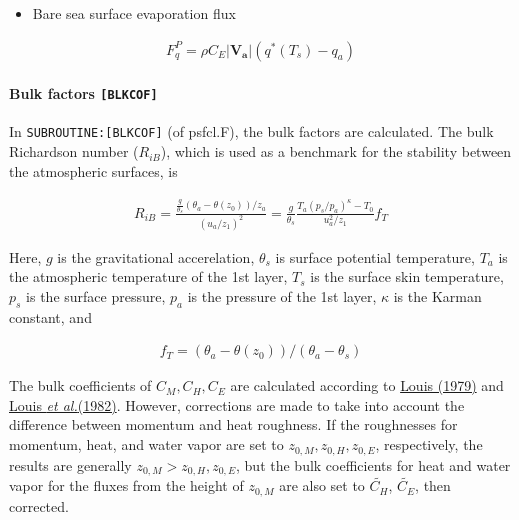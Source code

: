 \begin{itemize}
\tightlist
\item
  Bare sea surface evaporation flux
\end{itemize}

\begin{eqnarray}
    F_q^P = \rho C_E |\mathbf{V_a}| \left( q^{\ast}(T_s) - q_a \right)
\end{eqnarray}

\hypertarget{bulk-factors-blkcof}{%
\paragraph{\texorpdfstring{Bulk factors
\texttt{{[}BLKCOF{]}}}{Bulk factors {[}BLKCOF{]}}}\label{bulk-factors-blkcof}}

In \texttt{SUBROUTINE:{[}BLKCOF{]}} (of psfcl.F), the bulk factors are
calculated. The bulk Richardson number (\(R_{iB}\)), which is used as a
benchmark for the stability between the atmospheric surfaces, is

\begin{eqnarray}
R_{iB} =
            \frac{ \frac{g}{\theta_s} (\theta_a - \theta(z_0))/z_a }
              { (u_a/z_1)^2                                  }
       = \frac{g}{\theta_s}
         \frac{T_a (p_s/p_a)^\kappa - T_0 }{u_a^2/z_1} f_T
\end{eqnarray}

Here, \(g\) is the gravitational accerelation, \(\theta_s\) is surface
potential temperature, \(T_a\) is the atmospheric temperature of the 1st
layer, \(T_s\) is the surface skin temperature, \(p_s\) is the surface
pressure, \(p_a\) is the pressure of the 1st layer, \(\kappa\) is the
Karman constant, and

\begin{eqnarray}
f_T = (\theta_a - \theta(z_0))/(\theta_a - \theta_s)
\end{eqnarray}

The bulk coefficients of \(C_M,C_H,C_E\) are calculated according to
\href{https://link.springer.com/content/pdf/10.1007/BF00117978.pdf}{Louis
(1979)} and
\href{https://www.ecmwf.int/en/elibrary/10845-short-history-pbl-parameterization-ecmwf}{Louis
{\emph{et al.}}(1982)}. However, corrections are made to take into
account the difference between momentum and heat roughness. If the
roughnesses for momentum, heat, and water vapor are set to
\(z_{0,M}, z_{0,H}, z_{0,E}\), respectively, the results are generally
\(z_{0,M} > z_{0,H}, z_{0,E}\), but the bulk coefficients for heat and
water vapor for the fluxes from the height of \(z_{0,M}\) are also set
to \(\widetilde{C_H}\), \(\widetilde{C_E}\), then corrected.

